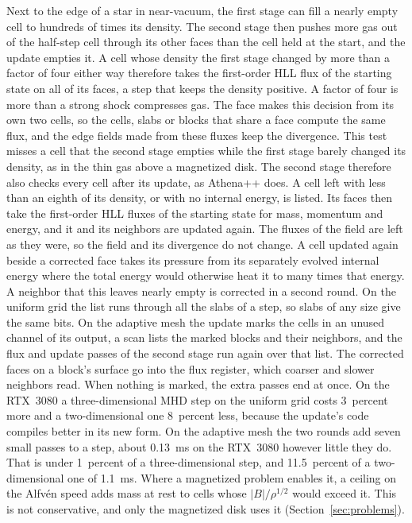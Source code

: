 \documentclass[twocolumn]{aastex701}
\begin{document}
Next to the edge of a star in near-vacuum, the first stage can fill a nearly empty cell to hundreds of times its density. The second stage then pushes more gas out of the half-step cell through its other faces than the cell held at the start, and the update empties it. A cell whose density the first stage changed by more than a factor of four either way therefore takes the first-order HLL flux of the starting state on all of its faces, a step that keeps the density positive. A factor of four is more than a strong shock compresses gas. The face makes this decision from its own two cells, so the cells, slabs or blocks that share a face compute the same flux, and the edge fields made from these fluxes keep the divergence. This test misses a cell that the second stage empties while the first stage barely changed its density, as in the thin gas above a magnetized disk. The second stage therefore also checks every cell after its update, as Athena++ does. A cell left with less than an eighth of its density, or with no internal energy, is listed. Its faces then take the first-order HLL fluxes of the starting state for mass, momentum and energy, and it and its neighbors are updated again. The fluxes of the field are left as they were, so the field and its divergence do not change. A cell updated again beside a corrected face takes its pressure from its separately evolved internal energy where the total energy would otherwise heat it to many times that energy. A neighbor that this leaves nearly empty is corrected in a second round. On the uniform grid the list runs through all the slabs of a step, so slabs of any size give the same bits. On the adaptive mesh the update marks the cells in an unused channel of its output, a scan lists the marked blocks and their neighbors, and the flux and update passes of the second stage run again over that list. The corrected faces on a block's surface go into the flux register, which coarser and slower neighbors read. When nothing is marked, the extra passes end at once. On the RTX~3080 a three-dimensional MHD step on the uniform grid costs 3~percent more and a two-dimensional one 8~percent less, because the update's code compiles better in its new form. On the adaptive mesh the two rounds add seven small passes to a step, about 0.13~ms on the RTX~3080 however little they do. That is under 1~percent of a three-dimensional step, and 11.5~percent of a two-dimensional one of 1.1~ms. Where a magnetized problem enables it, a ceiling on the Alfv\'en speed adds mass at rest to cells whose $|B|/\rho^{1/2}$ would exceed it. This is not conservative, and only the magnetized disk uses it (Section~\ref{sec:problems}).
\end{document}
